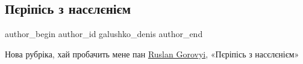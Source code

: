  
 
 
 
 

\subsection{Пєріпісь з насєлєнієм}
\label{sec:08_10_2022.fb.galushko_denis.1.p_r_p_s_z_nas_l_n_m}

\ifcmt
 author_begin
   author_id galushko_denis
 author_end
\fi

Нова рубріка, хай пробачить мене пан \href{https://www.facebook.com/gorovyi.ruslan}{Ruslan Gorovyi},
«Пєріпісь з насєлєнієм»
